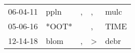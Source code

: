 \begin{supertabular}{p{0.07\textwidth}p{0.06\textwidth}p{0.02\textwidth}p{0.02\textwidth}p{0.06\textwidth}}
 06-04-11\textsuperscript{} &  ppln\textsuperscript{} &  , &             , &  mulc\textsuperscript{} \\
 05-06-16\textsuperscript{} &                   *OOT* &    &             , &  TIME\textsuperscript{} \\
 12-14-18\textsuperscript{} &  blom\textsuperscript{} &  , &  \textgreater &  debr\textsuperscript{} \\
\end{supertabular}
